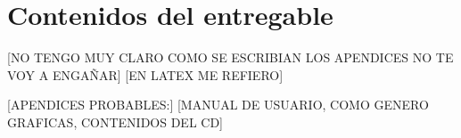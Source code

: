 \chapter{Contenidos del entregable}
[NO TENGO MUY CLARO COMO SE ESCRIBIAN LOS APENDICES NO TE VOY A ENGAÑAR]
[EN LATEX ME REFIERO]

[APENDICES PROBABLES:]
[MANUAL DE USUARIO, COMO GENERO GRAFICAS, CONTENIDOS DEL CD]









 